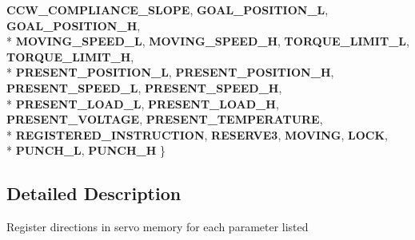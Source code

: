\begin{DoxyCompactItemize}
{\bfseries C\+C\+W\+\_\+\+C\+O\+M\+P\+L\+I\+A\+N\+C\+E\+\_\+\+S\+L\+O\+PE}, 
{\bfseries G\+O\+A\+L\+\_\+\+P\+O\+S\+I\+T\+I\+O\+N\+\_\+L}, 
{\bfseries G\+O\+A\+L\+\_\+\+P\+O\+S\+I\+T\+I\+O\+N\+\_\+H}, 
\\*
{\bfseries M\+O\+V\+I\+N\+G\+\_\+\+S\+P\+E\+E\+D\+\_\+L}, 
{\bfseries M\+O\+V\+I\+N\+G\+\_\+\+S\+P\+E\+E\+D\+\_\+H}, 
{\bfseries T\+O\+R\+Q\+U\+E\+\_\+\+L\+I\+M\+I\+T\+\_\+L}, 
{\bfseries T\+O\+R\+Q\+U\+E\+\_\+\+L\+I\+M\+I\+T\+\_\+H}, 
\\*
{\bfseries P\+R\+E\+S\+E\+N\+T\+\_\+\+P\+O\+S\+I\+T\+I\+O\+N\+\_\+L}, 
{\bfseries P\+R\+E\+S\+E\+N\+T\+\_\+\+P\+O\+S\+I\+T\+I\+O\+N\+\_\+H}, 
{\bfseries P\+R\+E\+S\+E\+N\+T\+\_\+\+S\+P\+E\+E\+D\+\_\+L}, 
{\bfseries P\+R\+E\+S\+E\+N\+T\+\_\+\+S\+P\+E\+E\+D\+\_\+H}, 
\\*
{\bfseries P\+R\+E\+S\+E\+N\+T\+\_\+\+L\+O\+A\+D\+\_\+L}, 
{\bfseries P\+R\+E\+S\+E\+N\+T\+\_\+\+L\+O\+A\+D\+\_\+H}, 
{\bfseries P\+R\+E\+S\+E\+N\+T\+\_\+\+V\+O\+L\+T\+A\+GE}, 
{\bfseries P\+R\+E\+S\+E\+N\+T\+\_\+\+T\+E\+M\+P\+E\+R\+A\+T\+U\+RE}, 
\\*
{\bfseries R\+E\+G\+I\+S\+T\+E\+R\+E\+D\+\_\+\+I\+N\+S\+T\+R\+U\+C\+T\+I\+ON}, 
{\bfseries R\+E\+S\+E\+R\+V\+E3}, 
{\bfseries M\+O\+V\+I\+NG}, 
{\bfseries L\+O\+CK}, 
\\*
{\bfseries P\+U\+N\+C\+H\+\_\+L}, 
{\bfseries P\+U\+N\+C\+H\+\_\+H}
 \}\hypertarget{group__SREGISTER__GROUP_ga06fc87d81c62e9abb8790b6e5713c55b}{}\label{group__SREGISTER__GROUP_ga06fc87d81c62e9abb8790b6e5713c55b}

\end{DoxyCompactItemize}


\subsection{Detailed Description}
Register directions in servo memory for each parameter listed 